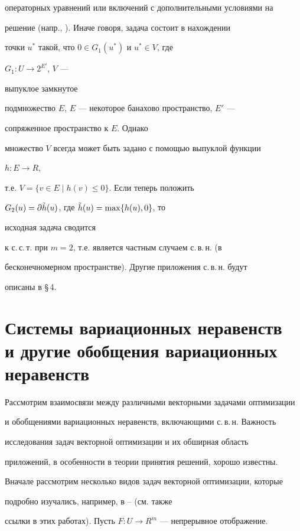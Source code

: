 операторных уравнений или включений с дополнительными условиями на


решение (напр., \cite{Vas}). Иначе говоря, задача состоит в нахождении


точки $u^*$ такой, что $0\in G_1(u^*)$ и $u^*\in V$, где


$G_1:U\to 2^{E'}$, $V$ ---


выпуклое замкнутое


подмножество $E$, $E$ --- некоторое банахово пространство, $E'$ ---


сопряженное пространство к $E$. Однако


множество $V$ всегда может быть задано с помощью выпуклой функции


$h:E\to R$,


т.е. $V=\{v\in E\mid h(v)\le 0\}$. Если теперь положить


$G_2(u)=\partial\Tilde h(u)$, где $\Tilde h(u)=\max\{h(u),0\}$, то


исходная задача сводится


к с.\,с.\,т. при $m=2$, т.е. является частным случаем с.\,в.\,н. (в


бесконечномерном пространстве). Другие приложения с.\,в.\,н. будут


описаны в \S\,4.





\section{Системы вариационных неравенств\protect\\


и другие обобщения вариационных неравенств}





Рассмотрим взаимосвязи между различными векторными задачами оптимизации


и обобщениями вариационных неравенств, включающими с.\,в.\,н. Важность


исследования задач векторной оптимизации и их обширная область


приложений, в особенности в теории принятия решений, хорошо известны.


Вначале рассмотрим несколько видов задач векторной оптимизации, которые


подробно изучались, например, в \cite{Pod1}--\cite{Yud} (см. также


ссылки в этих работах). Пусть $F:U\to R^m$ --- непрерывное отображение.


